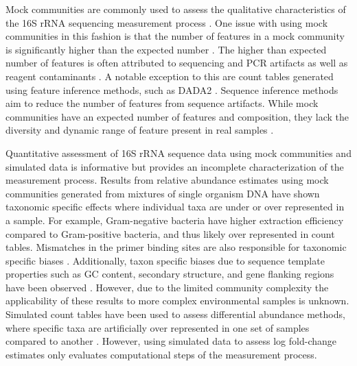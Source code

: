 \documentclass{bmcart}
\begin{document}

Mock communities are commonly used to assess the qualitative
characteristics of the 16S rRNA sequencing measurement process
\cite{bokulich2016mockrobiota}. One issue with using mock communities
in this fashion is that the number of features in a mock
community is significantly higher than the expected number
\cite{Kopylova2014}. The higher than expected number of features is
often attributed to sequencing and PCR artifacts as well as reagent
contaminants \cite{brooks2015truth, Huse2010}. A notable exception to
this are count tables generated using feature inference methods,
such as DADA2 \cite{callahan2016dada2}. Sequence
inference methods aim to reduce the number of features from sequence artifacts.
While mock communities have an expected number of features and
composition, they lack the diversity and dynamic range of feature
present in real samples \cite{bokulich2016mockrobiota}.

Quantitative assessment of 16S rRNA sequence data using mock communities and
simulated data is informative but provides an
incomplete characterization of the measurement process.
Results from relative abundance estimates using mock communities generated from
mixtures of single organism DNA have shown taxonomic specific effects
where individual taxa are under or over represented in a sample. For
example, Gram-negative bacteria have higher extraction efficiency
compared to Gram-positive bacteria, and thus likely over represented
in count tables\cite{Costea2017, Olson2012}.
Mismatches in the primer binding sites are also responsible for
taxonomic specific biases
\cite{brooks2015truth, klindworth2012evaluation, Gohl2016}.
Additionally, taxon specific biases due to sequence template properties
such as GC content, secondary structure, and gene flanking regions have
been observed \cite{Pinto2012, Hansen1998, Gohl2016}.
However, due to the limited community complexity the applicability of
these results to more complex environmental samples is unknown. Simulated count
tables have been used to assess differential abundance methods, where specific taxa are
artificially over represented in one set of samples compared to another
\cite{McMurdie2014}. However, using simulated data to assess log fold-change
estimates only evaluates computational steps of the measurement process.
\end{document}
